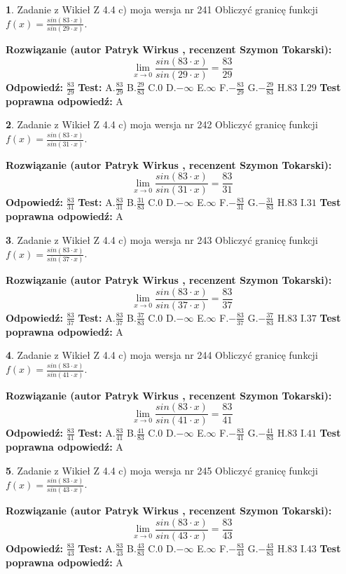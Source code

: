 \documentclass[12pt, a4paper]{article}
\theoremstyle{definition} %
\newtheorem{zad}{}
\newcommand{\zadStart}[1]{\begin{zad}#1\newline}
\newcommand{\zadStop}{\end{zad}}
\newcommand{\rozwStart}[2]{\noindent \textbf{Rozwiązanie (autor #1 , recenzent #2): }\newline}
\newcommand{\rozwStop}{\newline}
\newcommand{\odpStart}{\noindent \textbf{Odpowiedź:}\newline}
\newcommand{\odpStop}{\newline}
\newcommand{\testStart}{\noindent \textbf{Test:}\newline}
\newcommand{\testStop}{\newline}
\newcommand{\kluczStart}{\noindent \textbf{Test poprawna odpowiedź:}\newline}
\newcommand{\kluczStop}{\newline}
\begin{document}
\zadStart{Zadanie z Wikieł Z 4.4 c) moja wersja nr 241}
Obliczyć granicę funkcji $f(x)=\frac{sin(83\cdot x)}{sin(29\cdot x)}$.
\zadStop
\rozwStart{Patryk Wirkus}{Szymon Tokarski}
$$\lim\limits_{x\to 0}\frac{sin(83\cdot x)}{sin(29\cdot x)}=
\frac{83}{29}$$
\rozwStop
\odpStart
$\frac{83}{29}$
\odpStop
\testStart
A.$\frac{83}{29}$
B.$\frac{29}{83}$
C.$0$
D.$-\infty$
E.$\infty$
F.$-\frac{83}{29}$
G.$-\frac{29}{83}$
H.$83$
I.$29$
\testStop
\kluczStart
A
\kluczStop



\zadStart{Zadanie z Wikieł Z 4.4 c) moja wersja nr 242}
Obliczyć granicę funkcji $f(x)=\frac{sin(83\cdot x)}{sin(31\cdot x)}$.
\zadStop
\rozwStart{Patryk Wirkus}{Szymon Tokarski}
$$\lim\limits_{x\to 0}\frac{sin(83\cdot x)}{sin(31\cdot x)}=
\frac{83}{31}$$
\rozwStop
\odpStart
$\frac{83}{31}$
\odpStop
\testStart
A.$\frac{83}{31}$
B.$\frac{31}{83}$
C.$0$
D.$-\infty$
E.$\infty$
F.$-\frac{83}{31}$
G.$-\frac{31}{83}$
H.$83$
I.$31$
\testStop
\kluczStart
A
\kluczStop



\zadStart{Zadanie z Wikieł Z 4.4 c) moja wersja nr 243}
Obliczyć granicę funkcji $f(x)=\frac{sin(83\cdot x)}{sin(37\cdot x)}$.
\zadStop
\rozwStart{Patryk Wirkus}{Szymon Tokarski}
$$\lim\limits_{x\to 0}\frac{sin(83\cdot x)}{sin(37\cdot x)}=
\frac{83}{37}$$
\rozwStop
\odpStart
$\frac{83}{37}$
\odpStop
\testStart
A.$\frac{83}{37}$
B.$\frac{37}{83}$
C.$0$
D.$-\infty$
E.$\infty$
F.$-\frac{83}{37}$
G.$-\frac{37}{83}$
H.$83$
I.$37$
\testStop
\kluczStart
A
\kluczStop



\zadStart{Zadanie z Wikieł Z 4.4 c) moja wersja nr 244}
Obliczyć granicę funkcji $f(x)=\frac{sin(83\cdot x)}{sin(41\cdot x)}$.
\zadStop
\rozwStart{Patryk Wirkus}{Szymon Tokarski}
$$\lim\limits_{x\to 0}\frac{sin(83\cdot x)}{sin(41\cdot x)}=
\frac{83}{41}$$
\rozwStop
\odpStart
$\frac{83}{41}$
\odpStop
\testStart
A.$\frac{83}{41}$
B.$\frac{41}{83}$
C.$0$
D.$-\infty$
E.$\infty$
F.$-\frac{83}{41}$
G.$-\frac{41}{83}$
H.$83$
I.$41$
\testStop
\kluczStart
A
\kluczStop



\zadStart{Zadanie z Wikieł Z 4.4 c) moja wersja nr 245}
Obliczyć granicę funkcji $f(x)=\frac{sin(83\cdot x)}{sin(43\cdot x)}$.
\zadStop
\rozwStart{Patryk Wirkus}{Szymon Tokarski}
$$\lim\limits_{x\to 0}\frac{sin(83\cdot x)}{sin(43\cdot x)}=
\frac{83}{43}$$
\rozwStop
\odpStart
$\frac{83}{43}$
\odpStop
\testStart
A.$\frac{83}{43}$
B.$\frac{43}{83}$
C.$0$
D.$-\infty$
E.$\infty$
F.$-\frac{83}{43}$
G.$-\frac{43}{83}$
H.$83$
I.$43$
\testStop
\kluczStart
A
\kluczStop
\end{document}
